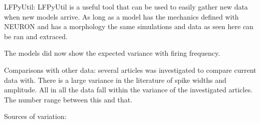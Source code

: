 \documentclass[altfont, fleqn]{uiophd}
\begin{document}
LFPyUtil: 
LFPyUtil is a useful tool that can be used to easily gather
new data when new models arrive. 
As long as a model has the mechanics defined with NEURON and has
a morphology the same simulations and data as seen here can be ran 
and extraced.

The models did now show the expected variance with firing frequency. 

Comparisons with other data:
several articles was investigated to compare current data with.
There is a large variance in the literature of spike widths and amplitude. 
All in all the data fall within the variance of the investigated articles. 
The number range between this and that.


Sources of variation:





\end{document}
